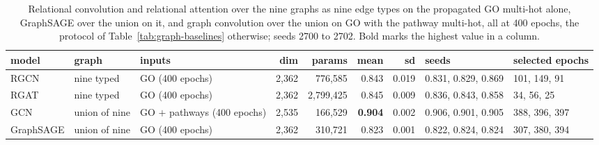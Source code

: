 \begin{table}[H]
  \centering
  \footnotesize
  \caption[Other message passing on GO]{Relational convolution and relational attention over the nine graphs as nine edge types on the propagated GO multi-hot alone, GraphSAGE over the union on it, and graph convolution over the union on GO with the pathway multi-hot, all at 400 epochs, the protocol of Table~\ref{tab:graph-baselines} otherwise; seeds 2700 to 2702. Bold marks the highest value in a column.}
  \label{tab:graph-go-rel}
  \begin{tabular}{@{}lllrrrrll@{}}
    \hline
    model & graph & inputs & dim & params & mean & sd & seeds & selected epochs \\
    \hline
    RGCN & nine typed & GO (400 epochs) & 2,362 & 776,585 & 0.843 & 0.019 & 0.831, 0.829, 0.869 & 101, 149, 91 \\
    RGAT & nine typed & GO (400 epochs) & 2,362 & 2,799,425 & 0.845 & 0.009 & 0.836, 0.843, 0.858 & 34, 56, 25 \\
    GCN & union of nine & GO $+$ pathways (400 epochs) & 2,535 & 166,529 & \textbf{0.904} & 0.002 & 0.906, 0.901, 0.905 & 388, 396, 397 \\
    GraphSAGE & union of nine & GO (400 epochs) & 2,362 & 310,721 & 0.823 & 0.001 & 0.822, 0.824, 0.824 & 307, 380, 394 \\
    \hline
  \end{tabular}
\end{table}
